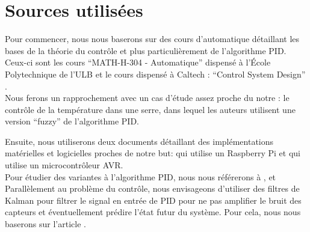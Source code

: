 \documentclass[a4paper,10pt]{article}
\begin{document}
\section{Sources utilisées}

Pour commencer, nous nous baserons sur des cours d'automatique détaillant les bases de la théorie du contrôle et plus particulièrement de l'algorithme PID. Ceux-ci sont les cours ``MATH-H-304 - Automatique'' \cite{Kinnaert2013} dispensé à l'École Polytechnique de l'ULB et le cours dispensé à Caltech : ``Control System Design'' \cite{Knospe2006}. \\

Nous ferons un rapprochement avec un cas d'étude assez proche du notre : le contrôle de la température dans une serre,  \cite{Zheying2014} dans lequel les auteurs utilisent une version ``fuzzy'' de l'algorithme PID.

Ensuite, nous utiliserons deux documents détaillant des implémentations matérielles et logicielles proches de notre but:  \cite{Ioannidis2014} qui utilise un Raspberry Pi et  \cite{ATMEL2005} qui utilise un microcontrôleur AVR. \\

Pour étudier des variantes à l'algorithme PID, nous nous référerons à  \cite{Afou2014},  \cite{ballard1993pid} et  \cite{Saletovi2014} \\

Parallèlement au problème du contrôle, nous envisageons d'utiliser des filtres de Kalman pour filtrer le signal en entrée de PID pour ne pas amplifier le bruit des capteurs et éventuellement prédire l'état futur du système. Pour cela, nous nous baserons sur l'article  \cite{Welch2006}.

\newpage

\printbibliography
\end{document}
